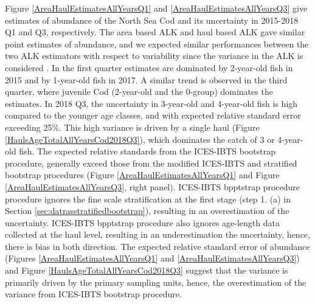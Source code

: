 \documentclass[a4paper 12pt]{article}
\numberwithin{equation}{section}
\begin{document}
 
 Figure \ref{AreaHaulEstimatesAllYearsQ1} and \ref{AreaHaulEstimatesAllYearsQ3} give estimates of abundance of the North Sea Cod and its uncertainty in 2015-2018 Q1 and Q3, respectively.  The area based ALK and haul based ALK gave similar point estimates of abundance, and we expected similar performances between the two ALK estimators with respect to variability since the variance in the ALK is considered \citep{aanes2015efficient}. In the first quarter estimates are dominated by  2-year-old fish in 2015 and by 1-year-old fish in 2017. A similar trend is observed in the third quarter, where juvenile Cod (2-year-old and the 0-group) dominates the estimates. In 2018 Q3, the uncertainty in 3-year-old and 4-year-old fish is high compared to the younger age classes, and with expected relative standard error exceeding 25\%. This high variance is driven by a single haul (Figure \ref{HaulsAgeTotalAllYearsCod2018Q3}), which dominates the catch of 3 or 4-year-old fish. The expected relative standards from the ICES-IBTS bootstrap procedure, generally exceed those from the modified ICES-IBTS and stratified bootstrap procedures (Figure \ref{AreaHaulEstimatesAllYearsQ1} and Figure \ref{AreaHaulEstimatesAllYearsQ3}, right panel). ICES-IBTS bpptstrap procedure procedure ignores the fine scale stratification at the first stage (step 1. (a)  in Section \ref{sec:datrasstratifiedbootstrap}), resulting in an overestimation of the uncertainty. ICES-IBTS bpptstrap procedure also ignores age-length data collected at the haul level, resulting in an underestimation the uncertainty, hence, there is bias in both direction. The expected relative standard error of abundance (Figures \ref{AreaHaulEstimatesAllYearsQ1} and  \ref{AreaHaulEstimatesAllYearsQ3}) and  Figure \ref{HaulsAgeTotalAllYearsCod2018Q3}  suggest that the variance is primarily driven by the primary sampling units, hence, the overestimation of the variance from ICES-IBTS bootstrap procedure.
\end{document}
